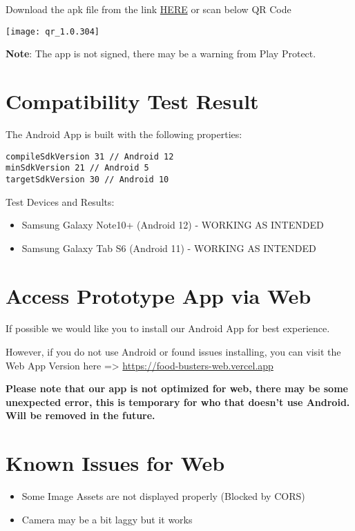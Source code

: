 \documentclass[a4paper,12pt]{article}
\begin{document}
\noindent
\begin{simplechar}
    Download the apk file from the link \href{https://github.com/Food-Busters/food_busters/releases/download/1.0.304/food_busters-1.0.304.apk}{HERE} or scan below QR Code
\end{simplechar}

\centerline{\texttt{[image: qr\_1.0.304]}}

\noindent
\textbf{Note}: The app is not signed, there may be a warning from Play Protect.

\section*{Compatibility Test Result}

\noindent
The Android App is built with the following properties:
\begin{lstlisting}
compileSdkVersion 31 // Android 12
minSdkVersion 21 // Android 5
targetSdkVersion 30 // Android 10
\end{lstlisting}

\noindent
Test Devices and Results:
\begin{itemize}
    \item Samsung Galaxy Note10+ (Android 12) - WORKING AS INTENDED
    \item Samsung Galaxy Tab S6 (Android 11) - WORKING AS INTENDED
\end{itemize}

\section*{Access Prototype App via Web}

If possible we would like you to install our Android App for best experience.

However, if you do not use Android or found issues installing,
you can visit the Web App Version here => \href{https://food-busters-web.vercel.app}{
    https://food-busters-web.vercel.app}

\textbf{
Please note that our app is not optimized for web, there may be some unexpected error, 
this is temporary for who that doesn't use Android. Will be removed in the future.}

\section*{Known Issues for Web}
\begin{itemize}
    \item Some Image Assets are not displayed properly (Blocked by CORS)
    \item Camera may be a bit laggy but it works
\end{itemize}
\end{document}
